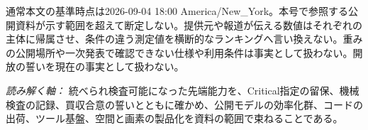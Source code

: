 \vspace{2mm}
\begin{claimboundary}[この号の読み方]
通常本文の基準時点は2026-09-04 18:00 America/New\_York。本号で参照する公開資料が示す範囲を超えて断定しない。提供元や報道が伝える数値はそれぞれの主体に帰属させ、条件の違う測定値を横断的なランキングへ言い換えない。重みの公開場所や一次発表で確認できない仕様や利用条件は事実として扱わない。開放の誓いを現在の事実として扱わない。
\end{claimboundary}

\vspace{2mm}
\noindent\textit{読み解く軸：} 統べられ検査可能になった先端能力を、Critical指定の留保、機械検査の記録、買収合意の誓いとともに確かめ、公開モデルの効率化群、コードの出荷、ツール基盤、空間と画素の製品化を資料の範囲で束ねることである。
